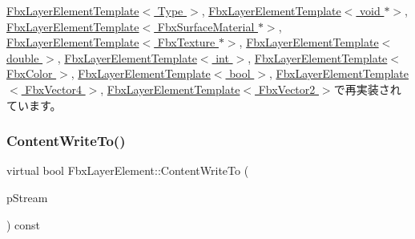 \hyperlink{class_fbx_layer_element_template_a19424f43272601bf018b8a0ba843b094}{Fbx\+Layer\+Element\+Template$<$ Type $>$}, \hyperlink{class_fbx_layer_element_template_a19424f43272601bf018b8a0ba843b094}{Fbx\+Layer\+Element\+Template$<$ void $\ast$$>$}, \hyperlink{class_fbx_layer_element_template_a19424f43272601bf018b8a0ba843b094}{Fbx\+Layer\+Element\+Template$<$ Fbx\+Surface\+Material $\ast$$>$}, \hyperlink{class_fbx_layer_element_template_a19424f43272601bf018b8a0ba843b094}{Fbx\+Layer\+Element\+Template$<$ Fbx\+Texture $\ast$$>$}, \hyperlink{class_fbx_layer_element_template_a19424f43272601bf018b8a0ba843b094}{Fbx\+Layer\+Element\+Template$<$ double $>$}, \hyperlink{class_fbx_layer_element_template_a19424f43272601bf018b8a0ba843b094}{Fbx\+Layer\+Element\+Template$<$ int $>$}, \hyperlink{class_fbx_layer_element_template_a19424f43272601bf018b8a0ba843b094}{Fbx\+Layer\+Element\+Template$<$ Fbx\+Color $>$}, \hyperlink{class_fbx_layer_element_template_a19424f43272601bf018b8a0ba843b094}{Fbx\+Layer\+Element\+Template$<$ bool $>$}, \hyperlink{class_fbx_layer_element_template_a19424f43272601bf018b8a0ba843b094}{Fbx\+Layer\+Element\+Template$<$ Fbx\+Vector4 $>$}, \hyperlink{class_fbx_layer_element_template_a19424f43272601bf018b8a0ba843b094}{Fbx\+Layer\+Element\+Template$<$ Fbx\+Vector2 $>$}で再実装されています。

\mbox{\label{class_fbx_layer_element_aa60d2178a7601f0e78a472fa7fd774aa}} 
\subsubsection{\texorpdfstring{Content\+Write\+To()}{ContentWriteTo()}}
{\footnotesize\ttfamily virtual bool Fbx\+Layer\+Element\+::\+Content\+Write\+To (\begin{DoxyParamCaption}\item[{\hyperlink{class_fbx_stream}{Fbx\+Stream} \&}]{p\+Stream }\end{DoxyParamCaption}) const\hspace{0.3cm}{\ttfamily [virtual]}}



